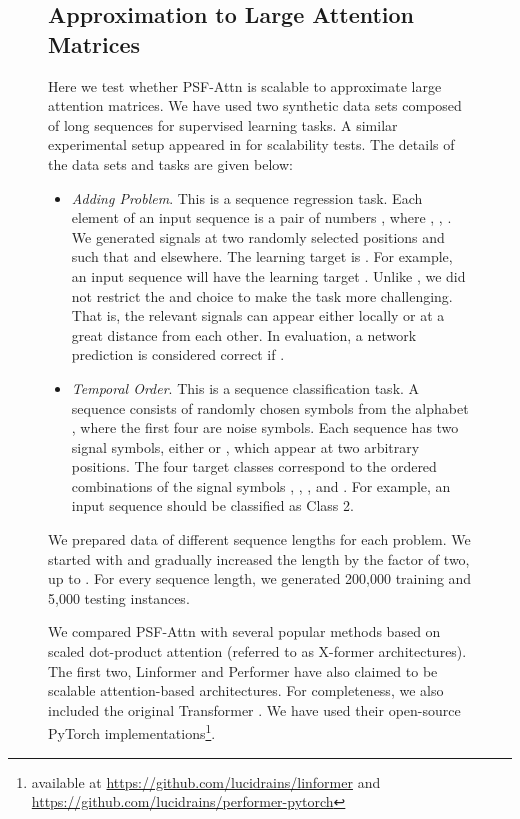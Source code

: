 \documentclass{article}
\begin{document}
\begin{figure}[t]
\begin{center}
\subsection{Approximation to Large Attention Matrices}
\label{sec:psfattn_synthetic}
Here we test whether PSF-Attn is scalable to approximate large attention matrices. We have used two synthetic data sets composed of long sequences for supervised learning tasks. A similar experimental setup appeared in \citep{hochreiter1997long} for scalability tests. The details of the data sets and tasks are given below:
\begin{itemize}
    \item \textit{Adding Problem}. This is a sequence regression task. Each element of an input sequence is a pair of numbers , where , , . We generated signals at two randomly selected positions  and  such that  and  elsewhere. The learning target is . For example, an input sequence  will have the learning target . Unlike \citep{hochreiter1997long}, we did not restrict the  and  choice to make the task more challenging. That is, the relevant signals can appear either locally or at a great distance from each other. In evaluation, a network prediction  is considered correct if .
    \item \textit{Temporal Order}. This is a sequence classification task. A sequence consists of randomly chosen symbols from the alphabet , where the first four are noise symbols. Each sequence has two signal symbols, either  or , which appear at two arbitrary positions. The four target classes correspond to the ordered combinations of the signal symbols , , , and . For example, an input sequence  should be classified as Class 2.
\end{itemize}
We prepared data of different sequence lengths for each problem. We started with  and gradually increased the length by the factor of two, up to . For every sequence length, we generated 200,000 training and 5,000 testing instances.

We compared PSF-Attn with several popular methods based on scaled dot-product attention (referred to as X-former architectures). The first two, Linformer \citep{linformer} and Performer \citep{performer} have also claimed to be scalable attention-based architectures. For completeness, we also included the original Transformer \citep{vaswani2017attention}. We have used their open-source PyTorch implementations\footnote{available at \url{https://github.com/lucidrains/linformer} and \url{https://github.com/lucidrains/performer-pytorch}}.


\end{center}
\end{figure}
\end{document}
